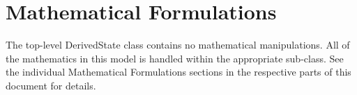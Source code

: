 %
%
% 
%

\section{Mathematical Formulations}

The top-level DerivedState class contains no mathematical manipulations.  All of the mathematics in this model is handled within the appropriate sub-class.  See the individual Mathematical Formulations sections in the respective parts of this document for details.

